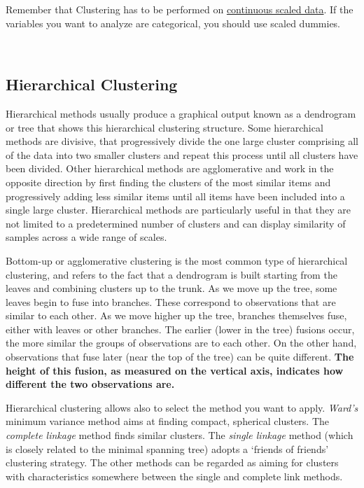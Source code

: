 \documentclass[
]{svmono}
\begin{document}
Remember that Clustering has to be performed on \ul{continuous scaled
data}. If the variables you want to analyze are categorical,
you should use scaled dummies.

~

\hypertarget{hierarchical-clustering}{%
\subsection{Hierarchical Clustering}\label{hierarchical-clustering}}

Hierarchical methods usually produce a graphical output known as a
dendrogram or tree that shows this hierarchical clustering structure.
Some hierarchical methods are divisive, that progressively divide the
one large cluster comprising all of the data into two smaller clusters
and repeat this process until all clusters have been divided. Other
hierarchical methods are agglomerative and work in the opposite
direction by first finding the clusters of the most similar items and
progressively adding less similar items until all items have been
included into a single large cluster. Hierarchical methods are
particularly useful in that they are not limited to a predetermined
number of clusters and can display similarity of samples across a wide
range of scales.

Bottom-up or agglomerative clustering is the most common type of
hierarchical clustering, and refers to the fact that a dendrogram is
built starting from the leaves and combining clusters up to the trunk.
As we move up the tree, some leaves begin to fuse into branches. These
correspond to observations that are similar to each other. As we move
higher up the tree, branches themselves fuse, either with leaves or
other branches. The earlier (lower in the tree) fusions occur, the more
similar the groups of observations are to each other. On the other hand,
observations that fuse later (near the top of the tree) can be quite
different. \textbf{The height of this fusion, as measured on the vertical
axis, indicates how different the two observations are.}

Hierarchical clustering allows also to select the method you want to
apply. \emph{Ward's} minimum variance method aims at finding compact,
spherical clusters. The \emph{complete linkage} method finds similar
clusters. The \emph{single linkage} method (which is closely related to the
minimal spanning tree) adopts a `friends of friends' clustering
strategy. The other methods can be regarded as aiming for clusters with
characteristics somewhere between the single and complete link methods.
\end{document}
